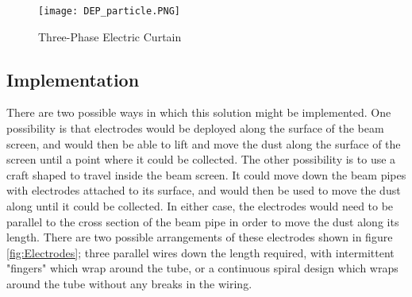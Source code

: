\documentclass[../main.tex]{subfiles}
\begin{document}
\begin{figure}[ht]
	\centering
	\texttt{[image: DEP\_particle.PNG]}
	\caption{Three-Phase Electric Curtain \cite{nasa_dep}}
\end{figure}

\subsection{Implementation}
There are two possible ways in which this solution might be implemented.
One possibility is that electrodes would be deployed along the surface of the beam screen, and would then be able to lift and move the dust along the surface of the screen until a point where it could be collected.
The other possibility is to use a craft shaped to travel inside the beam screen.
It could move down the beam pipes with electrodes attached to its surface, and would then be used to move the dust along until it could be collected.
In either case, the electrodes would need to be parallel to the cross section of the beam pipe in order to move the dust along its length.
There are two possible arrangements of these electrodes shown in figure \ref{fig:Electrodes}; three  parallel wires down the length required, with intermittent "fingers" which wrap around the tube, or a continuous spiral design which wraps around the tube without any breaks in the wiring.
\end{document}

